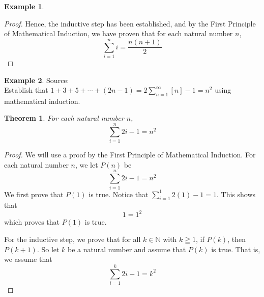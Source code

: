 \documentclass{book}
\newtheorem{theorem}{Theorem}[section]
\theoremstyle{definition}
\newtheorem{example}{Example}[definition]
\theoremstyle{remark}
\newcommand{\bb}[1]{\mathbb{#1}}
\begin{document}
\begin{example}
\begin{proof}
        Hence, the inductive step has been established, and by the First Principle of Mathematical Induction, we have proven that for each natural number $n$,
            \begin{equation*}
                \sum_{i=1}^{n}{i} = \frac{n(n+1)}{2}
            \end{equation*}
    \end{proof}
\end{example}





\newpage
\begin{example}
Source: \cite[Chap.1, S.1.1, Prob.1.1, Q.1.B]{david} \\ 

Establish  that $1 + 3 + 5  +\cdots + (2n - 1) = 2\sum_{n=1}^{\infty}{[n]} - 1 = n^2$ using mathematical induction.
    \begin{tcolorbox}
        \begin{theorem}
            For each natural number $n$,
                \begin{equation*}
                    \sum_{i=1}^{n}{2i-1} = n^2
                \end{equation*}
        \end{theorem}
    \end{tcolorbox}

    \begin{proof}
        We will use a proof by the First Principle of Mathematical Induction. For each natural number $n$, we let $P(n)$ be
            \begin{equation*}
                \sum_{i=1}^{n}{2i-1} = n^2
            \end{equation*}
        We first prove that $P(1)$ is true. Notice that $\sum_{i=1}^{1}{2(1)-1} = 1$. This shows that   
            \begin{equation*}
                 1 = 1^2
            \end{equation*}
        which proves that $P(1)$ is true. 
        
        For the inductive step, we prove that for all $k \in \bb{N}$ with $k \geqq 1$, if $P(k)$, then $P(k+1)$. So let $k$ be a natural number and assume that $P(k)$ is true. That is, we assume that 
            \begin{equation*}
                \sum_{i=1}^{k}{2i-1} = k^2
            \end{equation*}
        

\end{proof}
\end{example}
\end{document}
